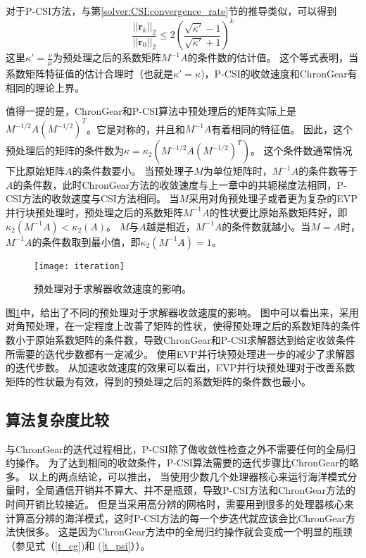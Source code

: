 对于P-CSI方法，与第\ref{solver:CSI:convergence_rate}节的推导类似，可以得到
\begin{equation}
\label{pcsi_convergence}
\frac{||\textbf{r}_k||_2}{||\textbf{r}_0||_2}  \le 2(\frac{\sqrt{\kappa'}-1}{\sqrt{\kappa'}+1})^k
\end{equation}
这里$\kappa' = \frac{\nu}{\mu}$为预处理之后的系数矩阵${M^{-1}A}$的条件数的估计值。
这个等式表明，当系数矩阵特征值的估计合理时（也就是$\kappa' =\kappa$)，P-CSI的收敛速度和ChronGear有相同的理论上界。

值得一提的是，ChronGear和P-CSI算法中预处理后的矩阵实际上是$M^{-1/2}A(M^{-1/2})^T$。它是对称的，并且和$M^{-1}A$有着相同的特征值\cite{Shewchuk1994}。
因此，这个预处理后的矩阵的条件数为$\kappa =  \kappa_2(M^{-1/2}A(M^{-1/2})^T)$。
这个条件数通常情况下比原始矩阵$A$的条件数要小。 
当预处理子$M$为单位矩阵时，${M^{-1}A}$的条件数等于$A$的条件数，此时ChronGear方法的收敛速度与上一章中的共轭梯度法相同，P-CSI方法的收敛速度与CSI方法相同。
当$M$采用对角预处理子或者更为复杂的EVP并行块预处理时，预处理之后的系数矩阵${M^{-1}A}$的性状要比原始系数矩阵好，即
$\kappa_2({M^{-1}A}) < \kappa_2(A)$。
$M$与$A$越是相近，$M^{-1}A$的条件数就越小。当$M = A$时，$M^{-1}A$的条件数取到最小值，即$\kappa_2(M^{-1 }A ) = 1$。 

\begin {figure}[!t]
\begin{center}
\texttt{[image: iteration]}
\caption []{预处理对于求解器收敛速度的影响。\label{fig:iteration}}
\end{center}
\end {figure}
图\ref{fig:iteration}中，给出了不同的预处理对于求解器收敛速度的影响。 
图中可以看出来，采用对角预处理，在一定程度上改善了矩阵的性状，使得预处理之后的系数矩阵的条件数小于原始系数矩阵的条件数，导致ChronGear和P-CSI求解器达到给定收敛条件所需要的迭代步数都有一定减少。
使用EVP并行块预处理进一步的减少了求解器的迭代步数。
从加速收敛速度的效果可以看出，EVP并行块预处理对于改善系数矩阵的性状最为有效，得到的预处理之后的系数矩阵的条件数也最小。

\subsection{算法复杂度比较}
\label{precond:ChronGear:comm}


与ChronGear的迭代过程相比，P-CSI除了做收敛性检查之外不需要任何的全局归约操作。 
为了达到相同的收敛条件，P-CSI算法需要的迭代步骤比ChronGear的略多。 
以上的两点结论，可以推出，
当使用少数几个处理器核心来运行海洋模式分量时，全局通信开销并不算大、并不是瓶颈，导致P-CSI方法和ChronGear方法的时间开销比较接近。
但是当采用高分辨的网格时，需要用到很多的处理器核心来计算高分辨的海洋模式，这时P-CSI方法的每一个步迭代就应该会比ChronGear方法快很多。
这是因为ChronGear方法中的全局归约操作就会变成一个明显的瓶颈（参见式（\ref{t_cg})和
(\ref{t_psi}））。

